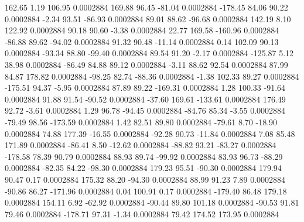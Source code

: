       162.65        1.19      106.95     0.0002884
      169.88       96.45      -81.04     0.0002884
     -178.45       84.06       90.22     0.0002884
       -2.34       93.51      -86.93     0.0002884
       89.01       88.62      -96.68     0.0002884
      142.19        8.10      122.92     0.0002884
       90.18       90.60       -3.38     0.0002884
       22.77      169.58     -160.96     0.0002884
      -86.88       89.62      -94.02     0.0002884
       91.32       90.48      -11.14     0.0002884
        0.14      102.09       90.13     0.0002884
      -93.34       88.80      -99.40     0.0002884
       89.54       91.20       -2.17     0.0002884
     -125.87        5.12       38.98     0.0002884
      -86.49       84.88       89.12     0.0002884
       -3.11       88.62       92.54     0.0002884
       87.99       84.87      178.82     0.0002884
      -98.25       82.74      -88.36     0.0002884
       -1.38      102.33       89.27     0.0002884
     -175.51       94.37       -5.95     0.0002884
       87.89       89.22     -169.31     0.0002884
        1.28      100.33      -91.64     0.0002884
       91.88       91.54      -90.52     0.0002884
      -37.60      169.61     -133.61     0.0002884
      176.49       92.72       -3.61     0.0002884
        1.29       96.78      -94.45     0.0002884
      -84.76       85.34       -3.55     0.0002884
      -79.49       98.56     -173.59     0.0002884
        1.42       82.51       89.80     0.0002884
      -79.61        8.70      -18.90     0.0002884
       74.88      177.39      -16.55     0.0002884
      -92.28       90.73      -11.84     0.0002884
        7.08       85.48      171.89     0.0002884
      -86.41        8.50      -12.62     0.0002884
      -88.82       93.21      -83.27     0.0002884
     -178.58       78.39       90.79     0.0002884
       88.93       89.74      -99.92     0.0002884
       83.93       96.73      -88.29     0.0002884
      -82.35       84.22      -98.30     0.0002884
      179.23       95.51      -90.30     0.0002884
      179.94       90.47        0.17     0.0002884
      175.32       88.20      -94.30     0.0002884
       88.99       91.23        7.89     0.0002884
      -90.86       86.27     -171.96     0.0002884
        0.04      100.91        0.17     0.0002884
     -179.40       86.48      179.18     0.0002884
      154.11        6.92      -62.92     0.0002884
      -90.44       89.80      101.18     0.0002884
      -90.53       91.81       79.46     0.0002884
     -178.71       97.31       -1.34     0.0002884
       79.42      174.52      173.95     0.0002884

